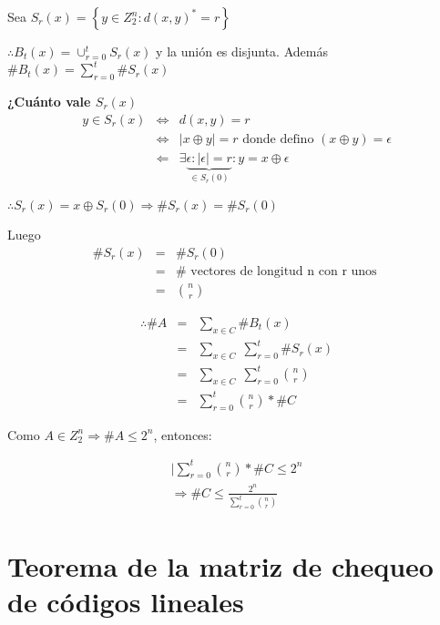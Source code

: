\documentclass[12pt,a4paper]{report}
\begin{document}
		\vspace{3mm}
		Sea $S_{r}(x) = \left\lbrace y \in Z_{2}^{n} : d(x, y)^{*} = r \right\rbrace$
		
		\vspace{3mm}
		$\therefore B_{t}(x) = \cup_{r = 0}^{t}S_{r}(x)$ y la unión es disjunta. Además $\#B_{t}(x) = \sum_{r = 0}^{t}\#S_{r}(x)$
		
		\vspace{3mm}
		\textbf{¿Cuánto vale $S_{r}(x)$}
		\begin{eqnarray}
			\nonumber y \in S_{r}(x) & \Leftrightarrow & d(x, y) = r \\
			\nonumber & \Leftrightarrow & \lvert x \oplus y \rvert = r \text{ donde defino } (x \oplus y) = \epsilon \\
			\nonumber & \Leftarrow & \exists \underbrace{\epsilon : \lvert \epsilon \rvert = r}_{\in S_{r}(0)} : y = x \oplus \epsilon
		\end{eqnarray}
		
		$\therefore S_{r}(x) = x \oplus S_{r}(0) \Rightarrow \#S_{r}(x) = \#S_{r}(0)$
		
		\vspace{3mm}
		Luego
		\begin{eqnarray}
			\nonumber \#S_{r}(x) &=& \#S_{r}(0) \\
			\nonumber &=& \# \text{ vectores de longitud n con r unos } \\
			\nonumber &=& {n \choose r} 
		\end{eqnarray}
		
		\begin{eqnarray}
			\nonumber \therefore \# A &=& \sum_{x \in C} \# B_{t}(x) \\
			\nonumber &=& \sum_{x \in C} \; \sum_{r= 0}^{t} \#S_{r}(x) \\
			\nonumber &=& \sum_{x \in C} \; \sum_{r = 0}^{t} {n \choose r} \\
			\nonumber &=& \sum_{r = 0}^{t} {n \choose r} * \# C
		\end{eqnarray}
		
		Como $A \in Z_{2}^{n} \Rightarrow \# A \leq 2^{n}$, entonces:
		
		\begin{eqnarray}
			\nonumber \lvert \sum_{r = 0}^{t} {n \choose r} * \# C \leq 2^{n} \\
			\nonumber \Rightarrow \# C \leq \frac{2^{n}}{\sum_{r = 0}^{t} {n \choose r}}
		\end{eqnarray}
		 
	\section{Teorema de la matriz de chequeo de códigos lineales}
	
\end{document}
